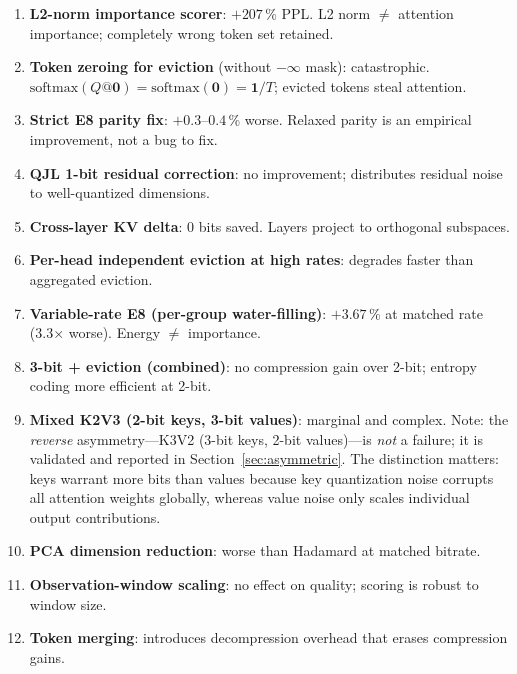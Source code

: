 \documentclass{article}
\begin{document}
\begin{enumerate}
  \item \textbf{L2-norm importance scorer}: $+207$\,\% PPL. L2 norm $\ne$
    attention importance; completely wrong token set retained.
  \item \textbf{Token zeroing for eviction} (without $-\infty$ mask): catastrophic.
    $\text{softmax}(Q@\mathbf{0}) = \text{softmax}(\mathbf{0}) = \mathbf{1}/T$;
    evicted tokens steal attention.
  \item \textbf{Strict E8 parity fix}: $+0.3$--$0.4$\,\% worse. Relaxed parity
    is an empirical improvement, not a bug to fix.
  \item \textbf{QJL 1-bit residual correction}: no improvement; distributes
    residual noise to well-quantized dimensions.
  \item \textbf{Cross-layer KV delta}: 0 bits saved. Layers project to orthogonal
    subspaces.
  \item \textbf{Per-head independent eviction at high rates}: degrades faster than
    aggregated eviction.
  \item \textbf{Variable-rate E8 (per-group water-filling)}: $+3.67$\,\% at
    matched rate (3.3$\times$ worse). Energy $\ne$ importance.
  \item \textbf{3-bit + eviction (combined)}: no compression gain over 2-bit;
    entropy coding more efficient at 2-bit.
  \item \textbf{Mixed K2V3 (2-bit keys, 3-bit values)}: marginal and complex.
    Note: the \emph{reverse} asymmetry---K3V2 (3-bit keys, 2-bit values)---is
    \emph{not} a failure; it is validated and reported in Section~\ref{sec:asymmetric}.
    The distinction matters: keys warrant more bits than values because key
    quantization noise corrupts all attention weights globally, whereas value
    noise only scales individual output contributions.
  \item \textbf{PCA dimension reduction}: worse than Hadamard at matched bitrate.
  \item \textbf{Observation-window scaling}: no effect on quality; scoring is
    robust to window size.
  \item \textbf{Token merging}: introduces decompression overhead that erases
    compression gains.
\end{enumerate}
\end{document}
